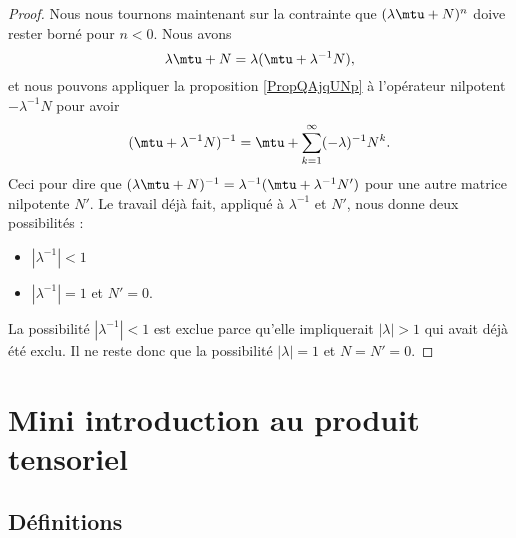 \begin{proof}
    Nous nous tournons maintenant sur la contrainte que \( (\lambda\mtu+N)^n\) doive rester borné pour \( n<0\). Nous avons
    \begin{equation}
        \lambda\mtu+N=\lambda(\mtu+\lambda^{-1}N),
    \end{equation}
    et nous pouvons appliquer la proposition \ref{PropQAjqUNp} à l'opérateur nilpotent \( -\lambda^{-1} N\) pour avoir
    \begin{equation}
        (\mtu+\lambda^{-1}N)^{-1}=\mtu+\sum_{k=1}^{\infty}(-\lambda)^{-1}N^k.
    \end{equation}
    Ceci pour dire que \( (\lambda\mtu+N)^{-1}=\lambda^{-1}(\mtu+\lambda^{-1}N')\) pour une autre matrice nilpotente \( N'\). Le travail déjà fait, appliqué à \( \lambda^{-1}\) et \( N'\), nous donne deux possibilités :
    \begin{itemize}
        \item \( | \lambda^{-1} |<1\)
        \item \( | \lambda^{-1} |=1\) et \( N'=0\).
    \end{itemize}
    La possibilité \( | \lambda^{-1} |<1\) est exclue parce qu'elle impliquerait \( | \lambda |>1\) qui avait déjà été exclu. Il ne reste donc que la possibilité \( | \lambda |=1\) et \( N=N'=0\).
\end{proof}

\section{Mini introduction au produit tensoriel}
\label{SeOOpHsn}

\subsection{Définitions}

